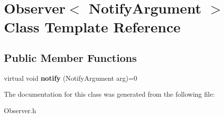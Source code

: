 \hypertarget{classObserver}{\section{Observer$<$ Notify\+Argument $>$ Class Template Reference}
\label{classObserver}
}
\subsection*{Public Member Functions}
\begin{DoxyCompactItemize}
\item 
\hypertarget{classObserver_ad6a783895b06113b2be6f2dbbeb6bdf4}{virtual void {\bfseries notify} (Notify\+Argument arg)=0}\label{classObserver_ad6a783895b06113b2be6f2dbbeb6bdf4}

\end{DoxyCompactItemize}


The documentation for this class was generated from the following file\+:\begin{DoxyCompactItemize}
\item 
Observer.\+h\end{DoxyCompactItemize}
